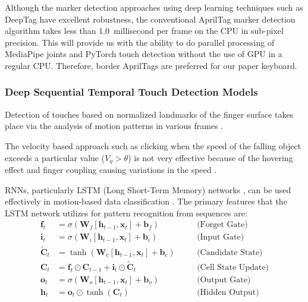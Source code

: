 Although the marker detection approaches using deep learning techniques such as DeepTag \cite{Zhang2022DeepTag} have excellent robustness, the conventional AprilTag marker detection algorithm \cite{Wang2016AprilTag2} takes less than 1.0~millisecond per frame on the CPU in sub-pixel precision. This will provide us with the ability to do parallel processing of MediaPipe joints and PyTorch touch detection without the use of GPU in a regular CPU. Therefore, border AprilTags are preferred for our paper keyboard.

\subsubsection{Deep Sequential Temporal Touch Detection Models}
Detection of touches based on normalized landmarks of the finger surface takes place via the analysis of motion patterns in various frames \cite{Hochreiter1997LSTM, Nunez2018Convolutional, Gammulle2021TMMF}.

The velocity based approach such as clicking when the speed of the falling object exceeds a particular value ($V_y > \theta$) is not very effective because of the hovering effect and finger coupling causing variations in the speed \cite{Simao2016Unsupervised, Toshpulatov2024RealTime}.

RNNs, particularly LSTM (Long Short-Term Memory) networks \cite{Hochreiter1997LSTM}, can be used effectively in motion-based data classification \cite{Doan2022Efficient, GilMartin2023Hand, Nunez2018Convolutional, Ikram2020Skeleton}. The primary features that the LSTM network utilizes for pattern recognition from sequences are:
\begin{align}
\mathbf{f}_t &= \sigma(\mathbf{W}_f [\mathbf{h}_{t-1}, \mathbf{x}_t] + \mathbf{b}_f) \quad &&\text{(Forget Gate)} \label{eq:lstm_forget_def} \\
\mathbf{i}_t &= \sigma(\mathbf{W}_i [\mathbf{h}_{t-1}, \mathbf{x}_t] + \mathbf{b}_i) \quad &&\text{(Input Gate)} \label{eq:lstm_input_def} \\
\tilde{\mathbf{C}}_t &= \tanh(\mathbf{W}_c [\mathbf{h}_{t-1}, \mathbf{x}_t] + \mathbf{b}_c) \quad &&\text{(Candidate State)} \label{eq:lstm_candidate_def} \\
\mathbf{C}_t &= \mathbf{f}_t \odot \mathbf{C}_{t-1} + \mathbf{i}_t \odot \tilde{\mathbf{C}}_t \quad &&\text{(Cell State Update)} \label{eq:lstm_cell_def} \\
\mathbf{o}_t &= \sigma(\mathbf{W}_o [\mathbf{h}_{t-1}, \mathbf{x}_t] + \mathbf{b}_o) \quad &&\text{(Output Gate)} \label{eq:lstm_output_def} \\
\mathbf{h}_t &= \mathbf{o}_t \odot \tanh(\mathbf{C}_t) \quad &&\text{(Hidden Output)} \label{eq:lstm_hidden_def}
\end{align}

